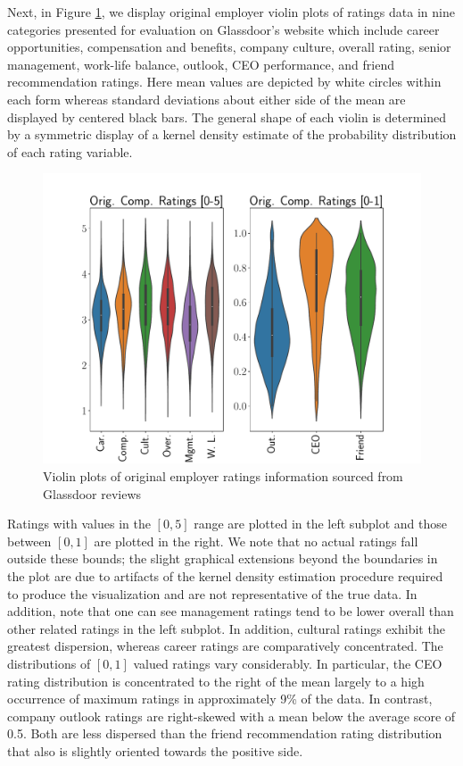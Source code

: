 \documentclass[10pt]{article}
\begin{document}
Next, in Figure \ref{fig:vioplt}, we display original employer violin plots of ratings data in nine 
categories presented for evaluation on Glassdoor's website which include career opportunities, compensation and benefits, company culture, 
overall rating, senior management, work-life balance, outlook, CEO performance, and friend recommendation 
ratings.  Here mean values are depicted by white circles within each form whereas standard deviations 
about either side of the mean are displayed by centered black bars.  The general shape of 
each violin is determined by a symmetric display of a kernel density estimate of the 
probability distribution of each rating variable.
%
\begin{figure}[thb]
    \centering
	\includegraphics[width=1.0\linewidth]{vioplt.pdf}
	\caption{Violin plots of original employer ratings information sourced from Glassdoor reviews }
	\label{fig:vioplt}
\end{figure}
%
Ratings with values in the $[0,5]$ range are plotted in the left subplot and those between 
$[0,1]$ are plotted in the right.  We note that no actual ratings fall outside these 
bounds; the slight graphical extensions beyond the boundaries in the plot are due to 
artifacts of the kernel density estimation procedure required to 
produce the visualization and are not representative of the true data. 
In addition, note that one can see management ratings tend to be lower overall than 
other related ratings in the left subplot.  In addition, cultural ratings exhibit 
the greatest dispersion, whereas career ratings are comparatively concentrated.
The distributions of $[0,1]$ valued ratings vary considerably.  In particular, the CEO rating distribution 
is concentrated to the right of the mean largely to a high occurrence of maximum ratings in 
approximately 9\% of the data.  In contrast, company outlook ratings are right-skewed with 
a mean below the average score of 0.5.  Both are less dispersed than the friend recommendation 
rating distribution that also is slightly oriented towards the positive side.
\end{document}
